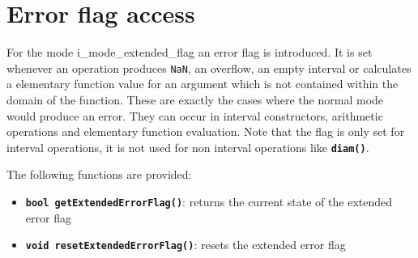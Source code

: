 \documentclass{report}
\begin{document}
\section{Error flag access}

For the mode i\_mode\_extended\_flag an error flag is introduced. It is set
whenever an operation produces \texttt{NaN}, an overflow, an empty interval or 
calculates a elementary function value for an argument which is not contained
within the domain of the function. These are exactly the cases where the normal
mode would produce an error. They can occur in interval constructors, arithmetic
operations and elementary function evaluation. Note that the flag is only set
for interval operations, it is not used for non interval operations like \texttt{\bf diam()}.

The following functions are provided:

\begin{itemize}
\item \texttt{\bf bool getExtendedErrorFlag()}: returns the current state of the
extended error flag
\item \texttt{\bf void resetExtendedErrorFlag()}: resets the extended error flag
\end{itemize}
\end{document}
